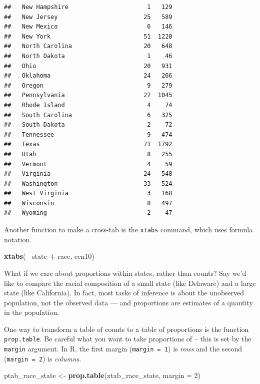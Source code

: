 \documentclass[]{book}
\newenvironment{Shaded}{\begin{snugshade}}{\end{snugshade}}
\newcommand{\DataTypeTok}[1]{\textcolor[rgb]{0.13,0.29,0.53}{#1}}
\newcommand{\DecValTok}[1]{\textcolor[rgb]{0.00,0.00,0.81}{#1}}
\newcommand{\KeywordTok}[1]{\textcolor[rgb]{0.13,0.29,0.53}{\textbf{#1}}}
\newcommand{\NormalTok}[1]{#1}
\newcommand{\OperatorTok}[1]{\textcolor[rgb]{0.81,0.36,0.00}{\textbf{#1}}}
\newcommand{\StringTok}[1]{\textcolor[rgb]{0.31,0.60,0.02}{#1}}
\theoremstyle{definition}
\theoremstyle{definition}
\theoremstyle{definition}
\theoremstyle{remark}
\begin{document}
\begin{verbatim}
##   New Hampshire                      1   129
##   New Jersey                        25   589
##   New Mexico                         6   146
##   New York                          51  1220
##   North Carolina                    20   648
##   North Dakota                       1    46
##   Ohio                              20   931
##   Oklahoma                          24   266
##   Oregon                             9   279
##   Pennsylvania                      27  1045
##   Rhode Island                       4    74
##   South Carolina                     6   325
##   South Dakota                       2    72
##   Tennessee                          9   474
##   Texas                             71  1792
##   Utah                               8   255
##   Vermont                            4    59
##   Virginia                          24   548
##   Washington                        33   524
##   West Virginia                      3   168
##   Wisconsin                          8   497
##   Wyoming                            2    47
\end{verbatim}

Another function to make a cross-tab is the \texttt{xtabs} command, which uses formula notation.

\begin{Shaded}
\begin{Highlighting}[]
\KeywordTok{xtabs}\NormalTok{(}\OperatorTok{~}\StringTok{ }\NormalTok{state }\OperatorTok{+}\StringTok{ }\NormalTok{race, cen10)}
\end{Highlighting}
\end{Shaded}

What if we care about proportions within states, rather than counts? Say we'd like to compare the racial composition of a small state (like Delaware) and a large state (like California). In fact, most tasks of inference is about the unobserved population, not the observed data --- and proportions are estimates of a quantity in the population.

One way to transform a table of counts to a table of proportions is the function \texttt{prop.table}. Be careful what you want to take proportions of -- this is set by the \texttt{margin} argument. In R, the first margin (\texttt{margin\ =\ 1}) is \emph{rows} and the second (\texttt{margin\ =\ 2}) is \emph{columns}.

\begin{Shaded}
\begin{Highlighting}[]
\NormalTok{ptab_race_state <-}\StringTok{ }\KeywordTok{prop.table}\NormalTok{(xtab_race_state, }\DataTypeTok{margin =} \DecValTok{2}\NormalTok{)}
\end{Highlighting}
\end{Shaded}
\end{document}
